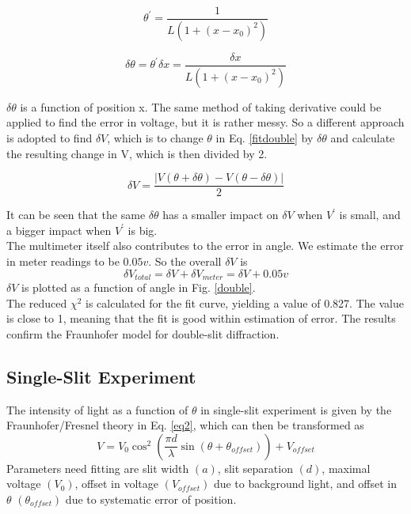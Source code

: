 \documentclass[prb,preprint]{revtex4-1}
\begin{document}
\begin{equation}
\theta^\prime = \frac{1}{L(1+(x-x_0)^2)}
\label{thetaprime}
\end{equation}

\begin{equation}
\delta\theta = \theta^\prime \delta x = \frac{\delta x}{L(1+(x-x_0)^2)}
\label{deltatheta}
\end{equation}

$\delta\theta$ is a function of position x. The same method of taking derivative could be applied to find the error in voltage, but it is rather messy. So a different approach is adopted to find $\delta V$, which is to change $\theta$ in Eq. \ref{fitdouble} by $\delta\theta$ and calculate the resulting change in V, which is then divided by 2.

\begin{equation}
\delta V = \frac{\left| V(\theta+\delta\theta)-V(\theta-\delta\theta)\right |}{2}
\label{deltav}
\end{equation}

It can be seen that the same $\delta\theta$ has a smaller impact on $\delta V$ when $V^\prime$ is small, and a bigger impact when $V^\prime$ is big.\\

The multimeter itself also contributes to the error in angle. We estimate the error in meter readings to be $0.05v$.
So the overall $\delta V$ is
\begin{equation}
\delta V_{total} = \delta V+\delta V_{meter} = \delta V + 0.05v
\label{deltavtotal}
\end{equation}
$\delta V$ is plotted as a function of angle in Fig. \ref{double}.\\

The reduced $\chi^2$ is calculated for the fit curve, yielding a value of 0.827. The value is close to 1, meaning that the fit is good within estimation of error. The results confirm the Fraunhofer model for double-slit diffraction. \\

\subsection{Single-Slit Experiment}

The intensity of light as a function of $\theta$ in single-slit experiment is given by the Fraunhofer/Fresnel theory in Eq. \ref{eq2}, which can then be transformed as
\begin{equation}
V=V_0 \cos^2(\frac{\pi d}{\lambda} \sin (\theta+\theta_{offset})) + V_{offset}
\label{fitsingle}
\end{equation}
Parameters need fitting are slit width $(a)$, slit separation $(d)$, maximal voltage $(V_0)$, offset in voltage $(V_{offset})$ due to background light, and offset in $\theta$ $(\theta_{offset})$ due to systematic error of position.\\
\end{document}
